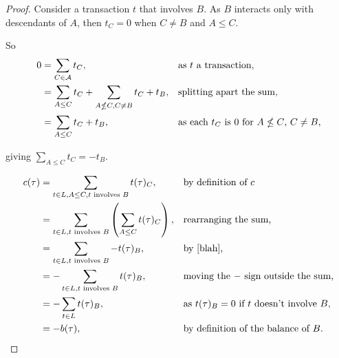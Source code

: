 \begin{proof}
    Consider a transaction $t$ that involves $B$.
    As $B$ interacts only with descendants of $A$, then $t_C = 0$ when $C \neq B$ and $A \leq C$.

    So
    \begin{equation}
        \begin{aligned}
            \label{blah}
            0 &= \sum_{C \in \mathcal{A}} t_C, && \text{as $t$ a transaction,} \\
            &= \sum_{A \leq C} t_C + \sum_{A \nleq C, C \neq B} t_C + t_B, && \text{splitting apart the sum,} \\
            &= \sum_{A \leq C} t_C + t_B, && \text{as each $t_C$ is $0$ for $A \nleq C$, $C \neq B$,}
        \end{aligned}
    \end{equation}

    giving $\sum_{A \leq C} t_C = -t_B$.

    \begin{align*}
        c(\tau) &= \sum_{t \in L, A \le C, t \text{ involves } B} t(\tau)_C, && \text{by definition of $c$} \\
        &= \sum_{t \in L, t \text{ involves } B} \left(\sum_{A \leq C} t(\tau)_C \right), && \text{rearranging the sum,} \\
        &= \sum_{t \in L, t \text{ involves } B} -t(\tau)_B, && \text{by \eqref{blah},} \\
        &= - \sum_{t \in L, t \text{ involves } B} t(\tau)_B, && \text{moving the $-$ sign outside the sum,} \\
        &= - \sum_{t \in L} t(\tau)_B, && \text{as $t(\tau)_B = 0$ if $t$ doesn't involve $B$,} \\
        &= - b(\tau), && \text{by definition of the balance of $B$.}
    \end{align*}
\end{proof}
